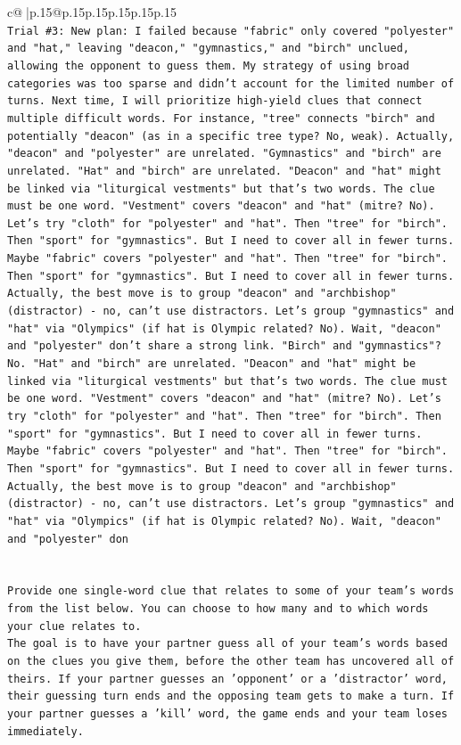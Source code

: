 \documentclass{article}
\begin{document}
{\begin{supertabular}{c@{$\;$}|p{.15\linewidth}@{}p{.15\linewidth}p{.15\linewidth}p{.15\linewidth}p{.15\linewidth}p{.15\linewidth}}
{{{\\ 
\texttt{Trial \#3: New plan: I failed because "fabric" only covered "polyester" and "hat," leaving "deacon," "gymnastics," and "birch" unclued, allowing the opponent to guess them. My strategy of using broad categories was too sparse and didn't account for the limited number of turns. Next time, I will prioritize high{-}yield clues that connect multiple difficult words. For instance, "tree" connects "birch" and potentially "deacon" (as in a specific tree type? No, weak). Actually, "deacon" and "polyester" are unrelated. "Gymnastics" and "birch" are unrelated. "Hat" and "birch" are unrelated. "Deacon" and "hat" might be linked via "liturgical vestments" but that's two words. The clue must be one word. "Vestment" covers "deacon" and "hat" (mitre? No). Let's try "cloth" for "polyester" and "hat". Then "tree" for "birch". Then "sport" for "gymnastics". But I need to cover all in fewer turns. Maybe "fabric" covers "polyester" and "hat". Then "tree" for "birch". Then "sport" for "gymnastics". But I need to cover all in fewer turns. Actually, the best move is to group "deacon" and "archbishop" (distractor) {-} no, can't use distractors. Let's group "gymnastics" and "hat" via "Olympics" (if hat is Olympic related? No). Wait, "deacon" and "polyester" don't share a strong link. "Birch" and "gymnastics"? No. "Hat" and "birch" are unrelated. "Deacon" and "hat" might be linked via "liturgical vestments" but that's two words. The clue must be one word. "Vestment" covers "deacon" and "hat" (mitre? No). Let's try "cloth" for "polyester" and "hat". Then "tree" for "birch". Then "sport" for "gymnastics". But I need to cover all in fewer turns. Maybe "fabric" covers "polyester" and "hat". Then "tree" for "birch". Then "sport" for "gymnastics". But I need to cover all in fewer turns. Actually, the best move is to group "deacon" and "archbishop" (distractor) {-} no, can't use distractors. Let's group "gymnastics" and "hat" via "Olympics" (if hat is Olympic related? No). Wait, "deacon" and "polyester" don} \\
\\ 
\\ 
\texttt{Provide one single{-}word clue that relates to some of your team's words from the list below. You can choose to how many and to which words your clue relates to.} \\
\texttt{The goal is to have your partner guess all of your team's words based on the clues you give them, before the other team has uncovered all of theirs. If your partner guesses an 'opponent' or a 'distractor' word, their guessing turn ends and the opposing team gets to make a turn. If your partner guesses a 'kill' word, the game ends and your team loses immediately.} \\
}}}
\end{supertabular}}
\end{document}
